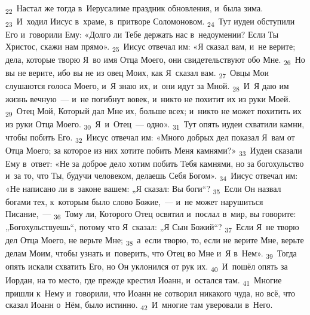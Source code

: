 \documentclass[a4paper,12pt]{article}
\begin{document}
\textsubscript{22}~Настал же тогда в~Иерусалиме праздник обновления, и~была зима.
\textsubscript{23}~И~ходил Иисус в~храме, в~притворе Соломоновом.
\textsubscript{24}~Тут иудеи обступили Его и~говорили Ему: «Долго ли Тебе держать нас в~недоумении? Если Ты Христос, скажи нам прямо».
\textsubscript{25}~Иисус отвечал им: «Я сказал вам, и~не верите; дела, которые творю Я~во имя Отца Моего, они свидетельствуют обо Мне.
\textsubscript{26}~Но вы не верите, ибо вы не из овец Моих, как Я~сказал вам.
\textsubscript{27}~Овцы Мои слушаются голоса Моего, и~Я знаю их, и~они идут за Мной.
\textsubscript{28}~И~Я даю им жизнь вечную~--- и~не погибнут вовек, и~никто не похитит их из руки Моей.
\textsubscript{29}~Отец Мой, Который дал Мне их, больше всех; и~никто не может похитить их из руки Отца Моего.
\textsubscript{30}~Я~и~Отец~--- одно».
\textsubscript{31}~Тут опять иудеи схватили камни, чтобы побить Его.
\textsubscript{32}~Иисус отвечал им: «Много добрых дел показал Я~вам от Отца Моего; за которое из них хотите побить Меня камнями?»
\textsubscript{33}~Иудеи сказали Ему в~ответ: «Не за доброе дело хотим побить Тебя камнями, но за богохульство и~за то, что Ты, будучи человеком, делаешь Себя Богом».
\textsubscript{34}~Иисус отвечал им: «Не написано ли в~законе вашем: „Я сказал: Вы боги“?
\textsubscript{35}~Если Он назвал богами тех, к~которым было слово Божие,~--- и~не может нарушиться Писание,~---
\textsubscript{36}~Тому ли, Которого Отец освятил и~послал в~мир, вы говорите: „Богохульствуешь“, потому что Я~сказал: „Я Сын Божий“?
\textsubscript{37}~Если Я~не творю дел Отца Моего, не верьте Мне;
\textsubscript{38}~а~если творю, то, если не верите Мне, верьте делам Моим, чтобы узнать и~поверить, что Отец во Мне и~Я в~Нем».
\textsubscript{39}~Тогда опять искали схватить Его, но Он уклонился от рук их.
\textsubscript{40}~И~пошёл опять за Иордан, на то место, где прежде крестил Иоанн, и~остался там.
\textsubscript{41}~Многие пришли к~Нему и~говорили, что Иоанн не сотворил никакого чуда, но всё, что сказал Иоанн о~Нём, было истинно.
\textsubscript{42}~И~многие там уверовали в~Него. 
\end{document}

